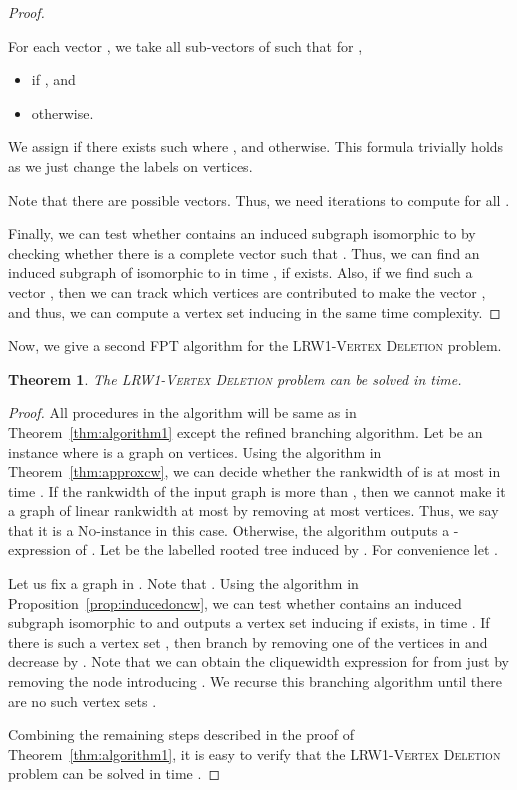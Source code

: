 \documentclass[11pt]{article}
\newtheorem{theorem}{Theorem}[section]
\theoremstyle{remark}
\newcommand{\LRWD}{\textsc{LRW1-Vertex Deletion} }
\newcommand{\NO}{\textsc{No}}
\begin{document}
\begin{proof}
\begin{enumerate}
For each vector , 
     we take all sub-vectors  of  
	such that for , 
	\begin{itemize}
	\item  if , and 
	\item  otherwise.
	\end{itemize}
We assign  if there exists such  where , 
and  otherwise.
This formula trivially holds as we just change the labels on vertices.

   Note that there are  possible vectors.
Thus, we need  iterations to compute  for all . 
\end{enumerate}







Finally, we can test whether  contains an induced subgraph isomorphic to  by checking 
whether there is a complete vector  such that .
Thus, we can find an induced subgraph of  isomorphic to  in time , if exists.
Also, if we find such a vector , then we can track which vertices are contributed to make the vector , 
and thus, we can compute a vertex set inducing  in the same time complexity.
\end{proof}

 Now, we give a second FPT algorithm for the \LRWD problem.
\begin{theorem}\label{thm:algorithm2}
The \LRWD problem can be solved in  time.
\end{theorem}

\begin{proof}
All procedures in the algorithm will be same as in Theorem~\ref{thm:algorithm1} except the refined branching algorithm. 
Let  be an instance where  is a graph on  vertices.
Using the algorithm in Theorem~\ref{thm:approxcw}, we can decide whether the rankwidth of  is at most  in time .
If the rankwidth of the input graph is more than , then we cannot make it a graph of linear rankwidth at most  by removing at most  vertices.
Thus, we say that it is a \NO-instance in this case.
Otherwise, the algorithm outputs a -expression  of .
Let  be the labelled rooted tree induced by .
For convenience let . 


Let us fix a graph  in .
Note that .
Using the algorithm in Proposition~\ref{prop:inducedoncw}, 
we can test whether  contains an induced subgraph isomorphic to  and outputs a vertex set inducing  if exists, in time .
If there is such a vertex set , then 
branch by removing one of the vertices  in  and decrease  by .
Note that we can obtain the cliquewidth expression for  from  just by removing the node introducing .
We recurse this branching algorithm until there are no such vertex sets .


Combining the remaining steps described in the proof of Theorem~\ref{thm:algorithm1}, 
it is easy to verify that the \LRWD problem can be solved in time .
\end{proof}
\end{document}
